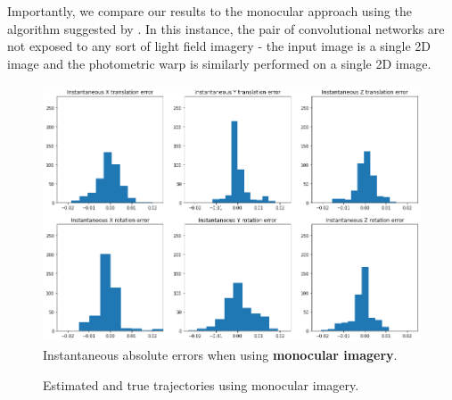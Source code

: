 Importantly, we compare our results to the monocular approach using the algorithm suggested by \cite{zhou2017unsupervised}. In this instance, the pair of convolutional networks are not exposed to any sort of light field imagery - the input image is a single 2D image and the photometric warp is similarly performed on a single 2D image. 

\begin{figure}[H]
    \centering
    \includegraphics[width=\textwidth, height=3in]{images/result-examples/pose/errors/singlewarp-stack.png}
    \caption{Instantaneous absolute errors when using \textbf{monocular imagery}.}
\end{figure}

\begin{figure}[H]
    \centering
    \caption{Estimated and true trajectories using monocular imagery.}
    \setcounter{subfigure}{0}
\end{figure}



